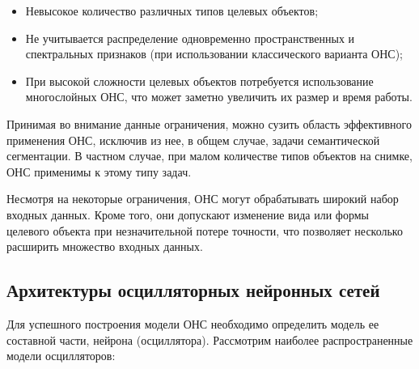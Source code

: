 \documentclass[14pt, russian]{scrartcl}
\begin{document}
\begin{itemize}
    \item Невысокое количество различных типов целевых объектов;
    \item Не учитывается распределение одновременно пространственных и спектральных признаков (при использовании классического варианта ОНС);
    \item При высокой сложности целевых объектов потребуется использование многослойных ОНС, что может заметно увеличить их размер и время работы.
\end{itemize}

Принимая во внимание данные ограничения, можно сузить область эффективного применения ОНС, исключив из нее, в общем случае, задачи семантической сегментации. В частном случае, при малом количестве типов объектов на снимке, ОНС применимы к этому типу задач.

Несмотря на некоторые ограничения, ОНС могут обрабатывать широкий набор входных данных. Кроме того, они допускают изменение вида или формы целевого объекта при незначительной потере точности, что позволяет несколько расширить множество входных данных.

\subsection{Архитектуры осцилляторных нейронных сетей}

Для успешного построения модели ОНС необходимо определить модель ее составной части, нейрона (осциллятора). Рассмотрим наиболее распространенные модели осцилляторов:
\end{document}
